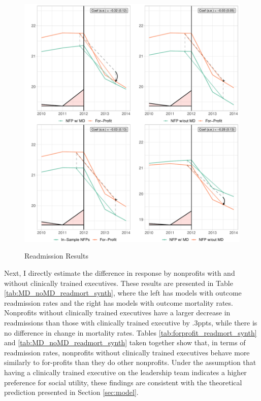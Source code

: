 \documentclass[12pt]{article}
\begin{document}
     \begin{figure}
         \centering
         \caption{Readmission Results}
         \includegraphics[width=\textwidth]{Objects/read_synth_plot.pdf}
         \label{fig:read_synth_plot}
     \end{figure}

     Next, I directly estimate the difference in response by nonprofits with and without clinically trained executives. These results are presented in Table \ref{tab:MD_noMD_readmort_synth}, where the left has models with outcome readmission rates and the right has models with outcome mortality rates. Nonprofits without clinically trained executives have a larger decrease in readmissions than those with clinically trained executive by .3ppts, while there is no difference in change in mortality rates. Tables \ref{tab:forprofit_readmort_synth} and \ref{tab:MD_noMD_readmort_synth} taken together show that, in terms of readmission rates, nonprofits without clinically trained executives behave more similarly to for-profits than they do other nonprofits. Under the assumption that having a clinically trained executive on the leadership team indicates a higher preference for social utility, these findings are consistent with the theoretical prediction presented in Section \ref{sec:model}. 
\end{document}
